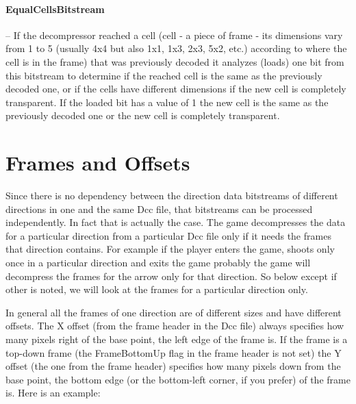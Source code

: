 \paragraph{EqualCellsBitstream} -- If the decompressor reached a cell (cell - 
a piece of frame - its dimensions vary from 1 to 5 (usually 4x4 but also 1x1, 
1x3, 2x3, 5x2, etc.) according to where the cell is in the frame) 
that was previously decoded it analyzes (loads) one bit from this bitstream to 
determine if the reached cell is the same as the previously decoded one, or if 
the cells have different dimensions if the new cell is completely transparent. 
If the loaded bit has a value of 1 the new cell is the same as the previously 
decoded one or the new cell is completely transparent.

\newpage
\section{Frames and Offsets}
Since there is no dependency between the direction data bitstreams of different 
directions in one and the same Dcc file, that bitstreams can be processed 
independently. In fact that is actually the case. The game decompresses the 
data for a particular direction from a particular Dcc file only if it needs the 
frames that direction contains. For example if the player enters the game, 
shoots only once in a particular direction and exits the game probably the game 
will decompress the frames for the arrow only for that direction. So below 
except if other is noted, we will look at the frames for a particular direction 
only.

In general all the frames of one direction are of different sizes and have 
different offsets. The X offset (from the frame header in the Dcc file) always 
specifies how many pixels right of the base point, the left edge of the frame 
is. If the frame is a top-down frame (the FrameBottomUp flag in the frame header 
is not set) the Y offset (the one from the frame header) specifies how many 
pixels down from the base point, the bottom edge (or the bottom-left corner, if 
you prefer) of the frame is. Here is an example:

